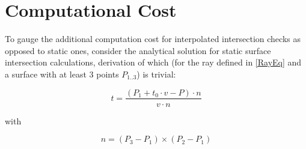 \section{Computational Cost}

To gauge the additional computation cost for interpolated intersection checks as opposed to static ones,
consider the analytical solution for static surface intersection calculations,
derivation of which (for the ray defined in \eqref{RayEq} and a surface with at least 3 points \(P_{1..3}\)) is trivial:

\begin{equation}
    t = \frac{(P_1 + t_0 \cdot v - P) \cdot n}{v \cdot n}
\end{equation}

with

\begin{equation}
    n = (P_3 - P_1) \times (P_2 - P_1)
\end{equation}


